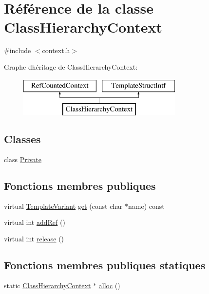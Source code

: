 \hypertarget{class_class_hierarchy_context}{}\section{Référence de la classe Class\+Hierarchy\+Context}
\label{class_class_hierarchy_context}


{\ttfamily \#include $<$context.\+h$>$}

Graphe d\textquotesingle{}héritage de Class\+Hierarchy\+Context\+:\begin{figure}[H]
\begin{center}
\leavevmode
\includegraphics[height=2.000000cm]{class_class_hierarchy_context}
\end{center}
\end{figure}
\subsection*{Classes}
\begin{DoxyCompactItemize}
\item 
class \hyperlink{class_class_hierarchy_context_1_1_private}{Private}
\end{DoxyCompactItemize}
\subsection*{Fonctions membres publiques}
\begin{DoxyCompactItemize}
\item 
virtual \hyperlink{class_template_variant}{Template\+Variant} \hyperlink{class_class_hierarchy_context_ace2735c7eaa883270d6111ffde6fabc7}{get} (const char $\ast$name) const 
\item 
virtual int \hyperlink{class_class_hierarchy_context_a3140454536d10f2fed6b11f911a8eb0a}{add\+Ref} ()
\item 
virtual int \hyperlink{class_class_hierarchy_context_a96c1871a3b349869f62b6c5d1e36759f}{release} ()
\end{DoxyCompactItemize}
\subsection*{Fonctions membres publiques statiques}
\begin{DoxyCompactItemize}
\item 
static \hyperlink{class_class_hierarchy_context}{Class\+Hierarchy\+Context} $\ast$ \hyperlink{class_class_hierarchy_context_afa4af242d04fb32a80cd4802ea44b6b3}{alloc} ()
\end{DoxyCompactItemize}


